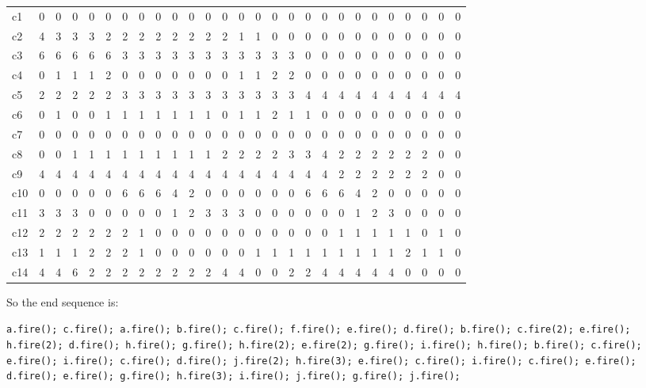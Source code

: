\documentclass{article}
\newcommand{\code}[1]{\texttt{#1}}
\begin{document}
\begin{table}[H]
\begin{tabular}{|l|llllllllllllllllllllllllll|}
c1  & 0 & 0 & 0 & 0 & 0 & 0 & 0 & 0 & 0 & 0 & 0 & 0 & 0 & 0 & 0 & 0 & 0 & 0 & 0 & 0 & 0 & 0 & 0 & 0 & 0 & 0 \\
c2  & 4 & 3 & 3 & 3 & 2 & 2 & 2 & 2 & 2 & 2 & 2 & 2 & 1 & 1 & 0 & 0 & 0 & 0 & 0 & 0 & 0 & 0 & 0 & 0 & 0 & 0 \\
c3  & 6 & 6 & 6 & 6 & 6 & 3 & 3 & 3 & 3 & 3 & 3 & 3 & 3 & 3 & 3 & 3 & 0 & 0 & 0 & 0 & 0 & 0 & 0 & 0 & 0 & 0 \\
c4  & 0 & 1 & 1 & 1 & 2 & 0 & 0 & 0 & 0 & 0 & 0 & 0 & 1 & 1 & 2 & 2 & 0 & 0 & 0 & 0 & 0 & 0 & 0 & 0 & 0 & 0 \\
c5  & 2 & 2 & 2 & 2 & 2 & 3 & 3 & 3 & 3 & 3 & 3 & 3 & 3 & 3 & 3 & 3 & 4 & 4 & 4 & 4 & 4 & 4 & 4 & 4 & 4 & 4 \\
c6  & 0 & 1 & 0 & 0 & 1 & 1 & 1 & 1 & 1 & 1 & 1 & 0 & 1 & 1 & 2 & 1 & 1 & 0 & 0 & 0 & 0 & 0 & 0 & 0 & 0 & 0 \\
c7  & 0 & 0 & 0 & 0 & 0 & 0 & 0 & 0 & 0 & 0 & 0 & 0 & 0 & 0 & 0 & 0 & 0 & 0 & 0 & 0 & 0 & 0 & 0 & 0 & 0 & 0 \\
c8  & 0 & 0 & 1 & 1 & 1 & 1 & 1 & 1 & 1 & 1 & 1 & 2 & 2 & 2 & 2 & 3 & 3 & 4 & 2 & 2 & 2 & 2 & 2 & 2 & 0 & 0 \\
c9  & 4 & 4 & 4 & 4 & 4 & 4 & 4 & 4 & 4 & 4 & 4 & 4 & 4 & 4 & 4 & 4 & 4 & 4 & 2 & 2 & 2 & 2 & 2 & 2 & 0 & 0 \\
c10 & 0 & 0 & 0 & 0 & 0 & 6 & 6 & 6 & 4 & 2 & 0 & 0 & 0 & 0 & 0 & 0 & 6 & 6 & 6 & 4 & 2 & 0 & 0 & 0 & 0 & 0 \\
c11 & 3 & 3 & 3 & 0 & 0 & 0 & 0 & 0 & 1 & 2 & 3 & 3 & 3 & 0 & 0 & 0 & 0 & 0 & 0 & 1 & 2 & 3 & 0 & 0 & 0 & 0 \\
c12 & 2 & 2 & 2 & 2 & 2 & 2 & 1 & 0 & 0 & 0 & 0 & 0 & 0 & 0 & 0 & 0 & 0 & 0 & 1 & 1 & 1 & 1 & 1 & 0 & 1 & 0 \\
c13 & 1 & 1 & 1 & 2 & 2 & 2 & 1 & 0 & 0 & 0 & 0 & 0 & 0 & 1 & 1 & 1 & 1 & 1 & 1 & 1 & 1 & 1 & 2 & 1 & 1 & 0 \\
c14 & 4 & 4 & 6 & 2 & 2 & 2 & 2 & 2 & 2 & 2 & 2 & 4 & 4 & 0 & 0 & 2 & 2 & 4 & 4 & 4 & 4 & 4 & 0 & 0 & 0 & 0 \\ \hline 
\end{tabular}
\end{table}

So the end sequence is:

\noindent\code{a.fire(); c.fire(); a.fire(); b.fire(); c.fire(); f.fire(); e.fire(); d.fire(); b.fire(); c.fire(2); e.fire(); h.fire(2); d.fire(); h.fire(); g.fire(); h.fire(2); e.fire(2); g.fire(); i.fire(); h.fire(); b.fire(); c.fire(); e.fire(); i.fire(); c.fire(); d.fire(); j.fire(2); h.fire(3); e.fire(); c.fire(); i.fire(); c.fire(); e.fire(); d.fire(); e.fire(); g.fire(); h.fire(3); i.fire(); j.fire(); g.fire(); j.fire();}
\end{document}
